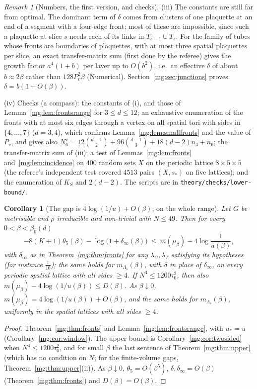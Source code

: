 \documentclass[11pt,a4paper]{article}
\newtheorem{corollary}[theorem]{Corollary}
\theoremstyle{definition}
\theoremstyle{remark}
\newtheorem{remark}[theorem]{Remark}
\begin{document}
\begin{remark}[Numbers, the first version, and checks]
(iii) The constants are still far from optimal. The dominant term of $\delta$ comes from clusters of one plaquette at an end of a segment with a
four-edge front; most of these are impossible, since such a plaquette at slice $s$ needs each of its links in $T_{s-1}\cup T_s$. For the family of
tubes whose fronts are boundaries of plaquettes, with at most three spatial plaquettes per slice, an exact transfer-matrix sum (first done by the
referee) gives the growth factor $a^4(1+b)$ per layer up to $O(b^2)$, i.e.\ an effective $\delta$ of about $b\approx2\beta$ rather than $128P_v^2\beta$
(Numerical). Section~\ref{mg:sec:junctions} proves $\delta=b(1+O(\beta))$.

(iv) Checks (a compass): the constants of (i), and those of Lemma~\ref{mg:lem:frontsrange} for $3\le d\le12$; an exhaustive enumeration of the
fronts with at most six edges through a vertex on all spatial tori with sides in $\{4,\dots,7\}$ ($d=3,4$), which confirms
Lemma~\ref{mg:lem:smallfronts} and the value of $P_v$, and gives also $N^v_6=12\binom{d-1}2+96\binom{d-1}3+18(d-2)n_4+n_6$; the transfer-matrix sum of
(iii); a test of Lemmas~\ref{mg:lem:fronts} and~\ref{mg:lem:incidence} on $400$ random sets $X$ on the periodic lattice $8\times5\times5$ (the referee's
independent test covered $4513$ pairs $(X,s_*)$ on five lattices); and the enumeration of $K_S$ and $2(d-2)$. The scripts are in
\texttt{theory/checks/lower-bound/}.
\end{remark}

\begin{corollary}[The gap is $4\log(1/u)+O(\beta)$, on the whole range]\label{mg:cor:sharpconst}
Let $G$ be metrisable and $\rho$ irreducible and non-trivial with $N\le49$. Then for every $0<\beta<\beta_0(d)$
\[
-8(K+1)\theta_5(\beta)-\log\bigl(1+\delta_\infty(\beta)\bigr)\ \le\ m(\mu_\beta)-4\log\frac1{u(\beta)},
\]
with $\delta_\infty$ as in Theorem~\ref{mg:thm:fronts} for any $\lambda_C,\lambda_T$ satisfying its hypotheses (for instance $\frac1{10}$); the same holds for
$m_{\Lambda_s}(\beta)$, with $\delta$ in place of $\delta_\infty$, on every periodic spatial lattice with all sides $\ge4$. If $N^4\le1200\tau_0^2$, then also
$m(\mu_\beta)-4\log(1/u(\beta))\le D(\beta)$. As $\beta\downarrow0$, $m(\mu_\beta)=4\log(1/u(\beta))+O(\beta)$, and the same holds for $m_{\Lambda_s}(\beta)$,
uniformly in the spatial lattices with all sides $\ge4$.
\end{corollary}

\begin{proof}
Theorem~\ref{mg:thm:fronts} and Lemma~\ref{mg:lem:frontsrange}, with $u_*=u$ (Corollary~\ref{mg:cor:window}). The upper bound is
Corollary~\ref{mg:cor:twosided} when $N^4\le1200\tau_0^2$, and for small $\beta$ the last sentence of Theorem~\ref{mg:thm:upper} (which has no condition on
$N$; for the finite-volume gaps, Theorem~\ref{mg:thm:upper}(ii)). As $\beta\downarrow0$, $\theta_5=O(\beta^5)$, $\delta,\delta_\infty=O(\beta)$
(Theorem~\ref{mg:thm:fronts}) and $D(\beta)=O(\beta)$.
\end{proof}
\end{document}
